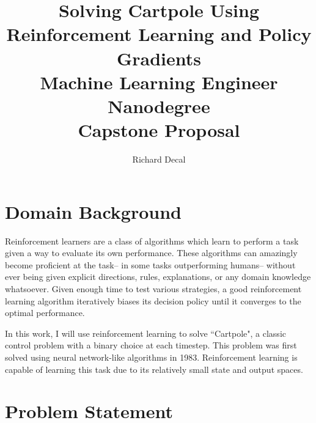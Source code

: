 \documentclass[12pt,a4paper]{article}
\author{Richard Decal\vspace{-13ex}}
\title{\vspace{-13ex}
  Solving Cartpole Using Reinforcement Learning and Policy Gradients \\
  \large Machine Learning Engineer Nanodegree\\
  Capstone Proposal}
\begin{document}
\maketitle




\section*{Domain Background}


Reinforcement learners are a class of algorithms which learn to perform a task given a way to evaluate its own performance. These algorithms can amazingly become proficient at the task-- in some tasks outperforming humans-- without ever being given explicit directions, rules, explanations, or any domain knowledge whatsoever. Given enough time to test various strategies, a good reinforcement learning algorithm iteratively biases its decision policy until it converges to the optimal performance.

In this work, I will use reinforcement learning to solve ``Cartpole", a classic control problem with a binary choice at each timestep. This problem was first solved using neural network-like algorithms in 1983.\cite{og_cartpole} Reinforcement learning is capable of learning this task due to its relatively small state and output spaces.\cite{deep_pg}\cite{ddpg_blog}


\section*{Problem Statement}
%
\end{document}
